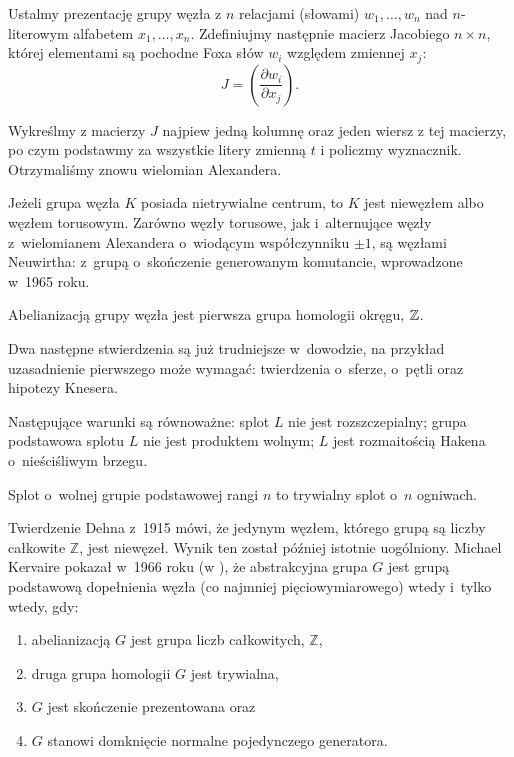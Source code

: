 Ustalmy prezentację grupy węzła z $n$ relacjami (słowami) $w_1, \ldots, w_n$ nad $n$-literowym alfabetem $x_1, \ldots, x_n$.
Zdefiniujmy następnie macierz Jacobiego $n \times n$, której elementami są pochodne Foxa słów $w_i$ względem zmiennej $x_j$:
\begin{equation}
    J = \left(\frac{\partial w_i}{\partial x_j}\right).
\end{equation}

Wykreślmy z macierzy $J$ najpiew jedną kolumnę oraz jeden wiersz z tej macierzy, po czym podstawmy za wszystkie litery zmienną $t$ i policzmy wyznacznik.
Otrzymaliśmy znowu wielomian Alexandera.

Jeżeli grupa węzła $K$ posiada nietrywialne centrum, to $K$ jest niewęzłem albo węzłem torusowym.
Zarówno węzły torusowe, jak i~alternujące węzły z~wielomianem Alexandera o~wiodącym współczynniku $\pm 1$, są węzłami Neuwirtha: z~grupą o~skończenie generowanym komutancie, wprowadzone w~1965 roku.

\begin{corollary}
    \label{prop:knot_group_abelianisation}
    Abelianizacją grupy węzła jest pierwsza grupa homologii okręgu, $\mathbb Z$.
\end{corollary}

Dwa następne stwierdzenia są już trudniejsze w~dowodzie,
na przykład uzasadnienie pierwszego może wymagać:
twierdzenia o~sferze, o~pętli oraz hipotezy Knesera.

\begin{proposition}
    \label{prop:knot_group_split}
    Następujące warunki są równoważne:
    splot $L$ nie jest rozszczepialny;
    grupa podstawowa splotu $L$ nie jest produktem wolnym;
    $L$ jest rozmaitością Hakena o~nieściśliwym brzegu.
\end{proposition}

\begin{proposition}
    \label{prop:knot_group_free}
    Splot o~wolnej grupie podstawowej rangi $n$ to trywialny splot o~$n$ ogniwach.
\end{proposition}

Twierdzenie Dehna z~1915 mówi, że jedynym węzłem,
którego grupą są liczby całkowite $\mathbb Z$, jest niewęzeł.
Wynik ten został później istotnie uogólniony.
Michael Kervaire pokazał w~1966 roku (w \cite{kervaire65}),
że abstrakcyjna grupa $G$ jest grupą podstawową dopełnienia węzła
(co najmniej pięciowymiarowego) wtedy i~tylko wtedy, gdy:
\begin{enumerate}[leftmargin=*]
    \itemsep0em
    \item abelianizacją $G$ jest grupa liczb całkowitych, $\mathbb Z$,
    \item druga grupa homologii $G$ jest trywialna,
    \item $G$ jest skończenie prezentowana oraz
    \item $G$ stanowi domknięcie normalne pojedynczego generatora.
\end{enumerate}

